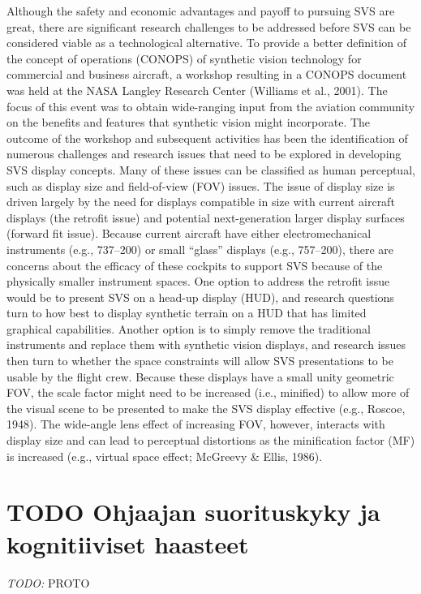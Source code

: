 \documentclass[utf8,bachelor,manualbib]{gradu3}
\begin{document}
Although the safety and economic advantages and payoff to pursuing SVS are
great, there are significant research challenges to be addressed before SVS can be
considered viable as a technological alternative. To provide a better definition of
the concept of operations (CONOPS) of synthetic vision technology for commercial
and business aircraft, a workshop resulting in a CONOPS document was held
at the NASA Langley Research Center (Williams et al., 2001). The focus of this
event was to obtain wide-ranging input from the aviation community on the benefits
and features that synthetic vision might incorporate. The outcome of the workshop
and subsequent activities has been the identification of numerous challenges
and research issues that need to be explored in developing SVS display concepts.
Many of these issues can be classified as human perceptual, such as display size
and field-of-view (FOV) issues.
The issue of display size is driven largely by the need for displays compatible in
size with current aircraft displays (the retrofit issue) and potential next-generation
larger display surfaces (forward fit issue). Because current aircraft have either
electromechanical instruments (e.g., 737–200) or small “glass” displays (e.g.,
757–200), there are concerns about the efficacy of these cockpits to support SVS
because of the physically smaller instrument spaces. One option to address the retrofit
issue would be to present SVS on a head-up display (HUD), and research
questions turn to how best to display synthetic terrain on a HUD that has limited
graphical capabilities. Another option is to simply remove the traditional instruments
and replace them with synthetic vision displays, and research issues then
turn to whether the space constraints will allow SVS presentations to be usable by the flight crew. Because these displays have a small unity geometric FOV, the scale
factor might need to be increased (i.e., minified) to allow more of the visual scene
to be presented to make the SVS display effective (e.g., Roscoe, 1948). The
wide-angle lens effect of increasing FOV, however, interacts with display size and
can lead to perceptual distortions as the minification factor (MF) is increased (e.g.,
virtual space effect; McGreevy \& Ellis, 1986). \citep{prinzel2004}

\section{TODO Ohjaajan suorituskyky ja kognitiiviset haasteet}

\emph{TODO:} PROTO 
\end{document}
